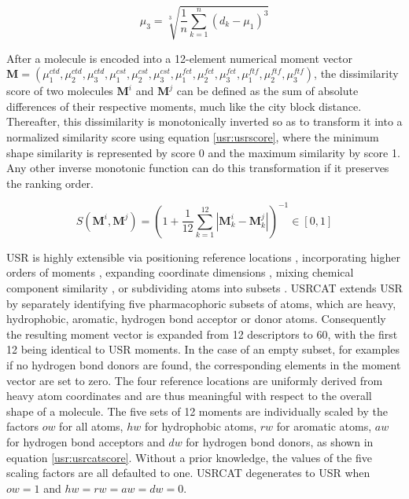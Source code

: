\begin{equation}
\mu_3=\sqrt[3]{\frac{1}{n}\sum_{k=1}^{n}{(d_k-\mu_1)^3}}
\label{usr:moment3}
\end{equation}

After a molecule is encoded into a 12-element numerical moment vector $\mathbf M=(\mu_1^{ctd}, \mu_2^{ctd}, \mu_3^{ctd}, \mu_1^{cst}, \mu_2^{cst}, \mu_3^{cst}, \mu_1^{fct}, \mu_2^{fct}, \mu_3^{fct}, \mu_1^{ftf}, \mu_2^{ftf}, \mu_3^{ftf})$, the dissimilarity score of two molecules $\mathbf M^i$ and $\mathbf M^j$ can be defined as the sum of absolute differences of their respective moments, much like the city block distance. Thereafter, this dissimilarity is monotonically inverted so as to transform it into a normalized similarity score using equation \eqref{usr:usrscore}, where the minimum shape similarity is represented by score 0 and the maximum similarity by score 1. Any other inverse monotonic function can do this transformation if it preserves the ranking order.

\begin{equation}
S(\mathbf M^i, \mathbf M^j)=(1+\frac{1}{12}\sum_{k=1}^{12}|\mathbf M_k^i-\mathbf M_k^j|)^{-1}\in[0, 1]
\label{usr:usrscore}
\end{equation}

USR \citep{1379} is highly extensible via positioning reference locations \citep{1334,1335}, incorporating higher orders of moments \citep{1333,1337}, expanding coordinate dimensions \citep{1337,1338}, mixing chemical component similarity \citep{1333,1407,1408}, or subdividing atoms into subsets \citep{1436,1331}. USRCAT \citep{1331} extends USR \citep{1379} by separately identifying five pharmacophoric subsets of atoms, which are heavy, hydrophobic, aromatic, hydrogen bond acceptor or donor atoms. Consequently the resulting moment vector is expanded from 12 descriptors to 60, with the first 12 being identical to USR moments. In the case of an empty subset, for examples if no hydrogen bond donors are found, the corresponding elements in the moment vector are set to zero. The four reference locations are uniformly derived from heavy atom coordinates and are thus meaningful with respect to the overall shape of a molecule. The five sets of 12 moments are individually scaled by the factors $ow$ for all atoms, $hw$ for hydrophobic atoms, $rw$ for aromatic atoms, $aw$ for hydrogen bond acceptors and $dw$ for hydrogen bond donors, as shown in equation \eqref{usr:usrcatscore}. Without a prior knowledge, the values of the five scaling factors are all defaulted to one. USRCAT degenerates to USR when $ow=1$ and $hw=rw=aw=dw=0$.

